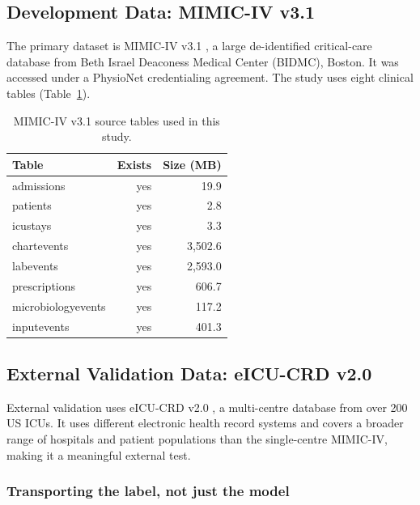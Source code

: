 \subsection{Development Data: MIMIC-IV v3.1}

The primary dataset is MIMIC-IV v3.1 \cite{johnson2023mimiciv}, a large
de-identified critical-care database from Beth Israel Deaconess Medical Center
(BIDMC), Boston. It was accessed under a PhysioNet credentialing agreement. The
study uses eight clinical tables (Table~\ref{tab:data_sources}).

\begin{table}[H]
    \centering
    \begin{tabular}{lrr}
        \toprule
        \textbf{Table}     & \textbf{Exists} & \textbf{Size (MB)} \\
        \midrule
        admissions         & yes             & 19.9               \\
        patients           & yes             & 2.8                \\
        icustays           & yes             & 3.3                \\
        chartevents        & yes             & 3,502.6            \\
        labevents          & yes             & 2,593.0            \\
        prescriptions      & yes             & 606.7              \\
        microbiologyevents & yes             & 117.2              \\
        inputevents        & yes             & 401.3              \\
        \bottomrule
    \end{tabular}
    \caption{MIMIC-IV v3.1 source tables used in this study.}
    \label{tab:data_sources}
\end{table}

\subsection{External Validation Data: eICU-CRD v2.0}

External validation uses eICU-CRD v2.0 \cite{pollard2018eicu}, a
multi-centre database from over 200 US ICUs. It uses different electronic health
record systems and covers a broader range of hospitals and patient populations
than the single-centre MIMIC-IV, making it a meaningful external test.

\subsubsection{Transporting the label, not just the model}
\label{sec:label_transport}

